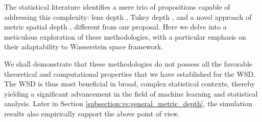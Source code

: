 \documentclass{imsart}
\numberwithin{equation}{section}
\begin{document}
The statistical literature identifies a mere trio of propositions capable of addressing this complexity: lens depth \cite{Geenens2023}, Tukey depth \citep{LopezTukeyMetric}, and a novel approach of metric spatial depth \citep{virta2023spatial}, different from our proposal. Here we delve into a meticulous exploration of these methodologies, with a particular emphasis on their adaptability to Wasserstein space framework. 

We shall demonstrate that these methodologies do not possess all the favorable theoretical and computational properties that we have established for the WSD. The WSD is thus most beneficial in broad, complex statistical contexts, thereby yielding a significant advancement in the field of machine learning and statistical analysis. Later in Section \ref{subsection:vs:general_metric_depth}, the simulation results also empirically support the above point of view. 
\end{document}

